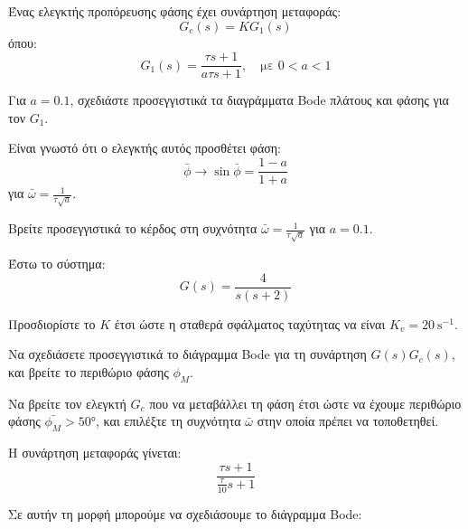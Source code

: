 \documentclass[11pt,a4paper,notitlepage,fleqn,final]{article}
\begin{document}
\begin{exercise}
Ένας ελεγκτής προπόρευσης φάσης έχει συνάρτηση μεταφοράς:
\[
G_c(s) = KG_1(s)
\]
όπου:
\[
G_1(s) = \frac{τs+1}{aτs+1},\quad \text{με } 0<a<1
\]

\begin{enumgreekparen}
	\item Για \( a = 0.1 \), σχεδιάστε προσεγγιστικά τα διαγράμματα Bode πλάτους και φάσης
	για τον \( G_1 \).
	\item Είναι γνωστό ότι ο ελεγκτής αυτός προσθέτει φάση:
	\[
	\bar\phi \rightarrow \sin\bar\phi = \frac{1-a}{1+a}
	\]
	για \( \bar\omega = \frac{1}{τ\sqrt{a}} \).
	
	Βρείτε προσεγγιστικά το κέρδος στη συχνότητα \( \bar\omega = \frac{1}{τ\sqrt{a}} \) για
	\( a=0.1 \).
	\item Έστω το σύστημα:
	\[
	G(s) = \frac{4}{s(s+2)}
	\]
	
	
	Προσδιορίστε το \( K \) έτσι ώστε η σταθερά σφάλματος ταχύτητας να είναι
	\( K_v = \SI{20}{\second^{-1}} \).
	\item Να σχεδιάσετε προσεγγιστικά το διάγραμμα Bode για τη συνάρτηση
	\( \displaystyle G(s)G_c(s) \), και βρείτε το περιθώριο φάσης \( \phi_M \).
	\item Να βρείτε τον ελεγκτή \( G_c \) που να μεταβάλλει τη φάση έτσι ώστε να έχουμε περιθώριο φάσης \( \bar{\phi_M} > \ang{50} \), και επιλέξτε τη συχνότητα
	\( \bar\omega  \) στην οποία πρέπει να τοποθετηθεί.
\end{enumgreekparen}

\tcblower
\begin{enumgreekparen}
	\item Η συνάρτηση μεταφοράς γίνεται:
	\[
	\frac{τs+1}{\frac{τ}{10}s+1}
	\]
	
	Σε αυτήν τη μορφή μπορούμε να σχεδιάσουμε το διάγραμμα Bode:
	

\end{enumgreekparen}
\end{exercise}
\end{document}
